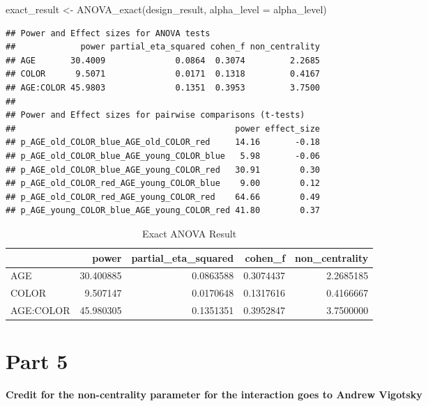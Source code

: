 \documentclass[
]{book}
\newenvironment{Shaded}{\begin{snugshade}}{\end{snugshade}}
\newcommand{\AttributeTok}[1]{\textcolor[rgb]{0.77,0.63,0.00}{#1}}
\newcommand{\FunctionTok}[1]{\textcolor[rgb]{0.00,0.00,0.00}{#1}}
\newcommand{\NormalTok}[1]{#1}
\newcommand{\OtherTok}[1]{\textcolor[rgb]{0.56,0.35,0.01}{#1}}
\begin{document}
\begin{Shaded}
\begin{Highlighting}[]
\NormalTok{exact\_result }\OtherTok{\textless{}{-}} \FunctionTok{ANOVA\_exact}\NormalTok{(design\_result, }\AttributeTok{alpha\_level =}\NormalTok{ alpha\_level)}
\end{Highlighting}
\end{Shaded}

\begin{verbatim}
## Power and Effect sizes for ANOVA tests
##             power partial_eta_squared cohen_f non_centrality
## AGE       30.4009              0.0864  0.3074         2.2685
## COLOR      9.5071              0.0171  0.1318         0.4167
## AGE:COLOR 45.9803              0.1351  0.3953         3.7500
## 
## Power and Effect sizes for pairwise comparisons (t-tests)
##                                            power effect_size
## p_AGE_old_COLOR_blue_AGE_old_COLOR_red     14.16       -0.18
## p_AGE_old_COLOR_blue_AGE_young_COLOR_blue   5.98       -0.06
## p_AGE_old_COLOR_blue_AGE_young_COLOR_red   30.91        0.30
## p_AGE_old_COLOR_red_AGE_young_COLOR_blue    9.00        0.12
## p_AGE_old_COLOR_red_AGE_young_COLOR_red    64.66        0.49
## p_AGE_young_COLOR_blue_AGE_young_COLOR_red 41.80        0.37
\end{verbatim}

\begin{table}[!h]

\caption{\label{tab:unnamed-chunk-132}Exact ANOVA Result}
\centering
\begin{tabular}[t]{l|r|r|r|r}
\hline
  & power & partial\_eta\_squared & cohen\_f & non\_centrality\\
\hline
AGE & 30.400885 & 0.0863588 & 0.3074437 & 2.2685185\\
\hline
COLOR & 9.507147 & 0.0170648 & 0.1317616 & 0.4166667\\
\hline
AGE:COLOR & 45.980305 & 0.1351351 & 0.3952847 & 3.7500000\\
\hline
\end{tabular}
\end{table}

\hypertarget{part-5}{%
\section{Part 5}\label{part-5}}

\textbf{Credit for the non-centrality parameter for the interaction goes to Andrew Vigotsky}
\end{document}
